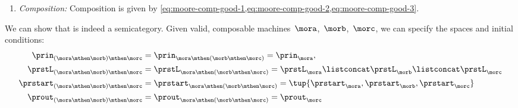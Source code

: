 {\begin{definition}[\Moore]
\begin{enumerate}
\begin{itemize}
                      \item $ \prreadout_{\mora} \colon \tupset(\prstL_{\mora})  \mtoin\Set \prout_{\mora}$.
                  \end{itemize}
            \item \emph{Composition:}
                  Composition is given by \cref{eq:moore-comp-good-1,eq:moore-comp-good-2,eq:moore-comp-good-3}.
        \end{enumerate}
    \end{definition}
    We can show that \Moore is indeed a semicategory.
    Given valid, composable machines~$\mora$,~$\morb$,~$\morc$, we can specify the spaces and initial conditions:
    \begin{equation*}
        \label{eq:moore_assoc_spaces}
        \begin{aligned}
            \prin_{(\mora \mthen \morb)\mthen \morc}    & =\prin_{\mora \mthen (\morb \mthen \morc)}=\prin_{\mora}, \\
            \prstL_{(\mora \mthen \morb)\mthen \morc}   & =\prstL_{\mora \mthen (\morb \mthen \morc)}=  \prstL_{\mora} \listconcat \prstL_{\morb} \listconcat  \prstL_{\morc} \\
            \prstart_{(\mora \mthen \morb)\mthen \morc} & =\prstart_{\mora \mthen (\morb \mthen \morc)}=\tup{\prstart_\mora,\prstart_\morb,\prstart_\morc} \\
            \prout_{(\mora \mthen \morb)\mthen \morc}   & =\prout_{\mora \mthen (\morb \mthen \morc)}=\prout_\morc
        \end{aligned}
    \end{equation*}

}
